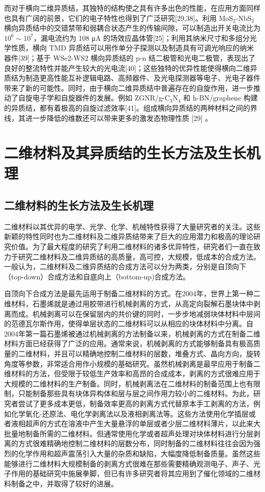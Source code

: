     而对于横向二维异质结，其独特的结构使之具有许多出色的性能，在应用方面同样也具有广阔的前景，它们的电子特性也得到了广泛研究[29,38]。利用 MoS$_2$-NbS$_2$ 横向异质结中的交错禁带和弱耦合状态产生的传输间隙，可以制造出开关电流比为 $10^6 \sim 10^7$，漏电流约为 108 \si{\micro\ampere} 的场效应晶体管[25]；利用其纳米尺寸和多组分光学性质，横向 TMD 异质结可以用作单分子探测以及制造具有可调光响应的纳米器件[39]；基于 WSe2-WS2 横向异质结的 p-n 结二极管和光电二极管，表现出了良好的整流特性并能产生较大的光电流[40]；这些独特的优异性能使得横向二维异质结为制造更高性能互补逻辑电路、高频器件、及光电探测器等电子、光电子器件带来了新的可能性。同时，由于横向二维异质结中普遍存在的自旋作用，进一步推动了自旋电子学和自旋器件的发展。例如 ZGNR/g-C$_3$N$_4$ 和 h-BN/graphene 构建的异质结，都有着极高的自旋过滤效率[41]。组成横向异质结的两种材料之间的界线，其进一步降低的维数还可以带来更多的激发态物理性质 [29] 。

\section{二维材料及其异质结的生长方法及生长机理}
\subsection{二维材料的生长方法及生长机理}
    二维材料以其优异的电学、光学、化学、机械特性获得了大量研究者的关注。这些新颖的特性同时也为二维材料及二维异质结带来了巨大的应用潜力和极高的理论研究价值。为了最大程度的研究了利用二维材料的诸多优异特性，研究者们一直在致力于研究二维材料及二维异质结的高质量，高可控，大规模，低成本的合成方法。一般认为，二维材料及二维异质结的合成方法可以分为两类，分别是自顶向下（top-down）合成方法和自底向上（bottom-up)合成方法。%

    自顶向下合成方法是最先运用于制备二维材料的方式。在2004年，世界上第一种二维材料，石墨烯就是通过用胶带进行机械剥离的方式，从高定向裂解石墨块体中剥离而成。机械剥离可以在保留层内的共价键的同时，一步步地减弱块体材料中层间的范德瓦尔斯作用，使得单层状态的二维材料可以从相应的块体材料中分离。自2004年第一篇石墨烯被通过机械剥离的方法制备以来，机械剥离的方式在制备二维材料方面已经获得了广泛的应用。通常来说，机械剥离的方式能够制备具有极高质量的二维材料，并且可以精确地控制二维材料的层数，堆叠方式、晶向方向，旋转角度等参数，非常适合用作小规模的基础研究。虽然机械剥离是最早应用于制备二维材料的方法，但受限于较低生产效率和高昂的合成成本，剥离的方式很难应用于大规模的二维材料的生产制备。同时，机械剥离法在二维材料的制备范围上也有限制，只能制备那些具有块体异构体和层与层之间作用力较小的二维材料。为此，研究者尝试了更多成本更低，制备效率更高的剥离方式代替原本手工剥离的方法，例如化学氧化-还原法、电化学剥离法以及液相剥离法等。这些方法使用化学插层或者液相超声的方式在溶液中产生大量悬浮的单层或者少层二维材料薄片，以此来大批量地制备所需的二维材料。但通常使用化学或者超声处理对块体材料进行分层剥离的方式很难精确地控制二维材料的层数分布，同时制备的二维材料往往会因为强烈的化学作用和超声震荡引入大量的杂质和缺陷，大幅度降低制备质量。虽然这些能够进行二维材料大规模制备的剥离方式很难在那些需要精确观测电子、声子、光子作用的基础研究中施展拳脚，但已有许多研究者将其应用到了催化领域的二维材料制备之中，并取得了较好的进展。

